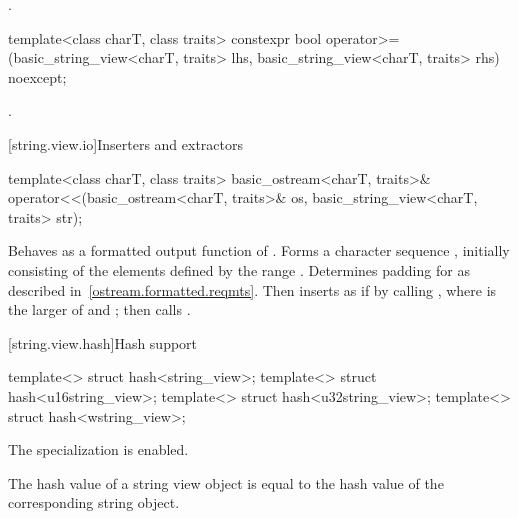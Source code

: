 \begin{itemdescr}
\pnum
\returns
{}.
\end{itemdescr}

%
\begin{itemdecl}
template<class charT, class traits>
  constexpr bool operator>=(basic_string_view<charT, traits> lhs,
                            basic_string_view<charT, traits> rhs) noexcept;
\end{itemdecl}

\begin{itemdescr}
\pnum
\returns
{}.
\end{itemdescr}

[string.view.io]{Inserters and extractors}

%
\begin{itemdecl}
template<class charT, class traits>
  basic_ostream<charT, traits>&
    operator<<(basic_ostream<charT, traits>& os, basic_string_view<charT, traits> str);
\end{itemdecl}

\begin{itemdescr}
\pnum
\effects
Behaves as a formatted output
function of . Forms a character sequence
, initially consisting of the elements defined by the range
. Determines padding for 
as described in~\ref{ostream.formatted.reqmts}.
Then inserts  as if by calling
, where  is the larger
of  and ;
then calls .

\pnum
\returns
{}
\end{itemdescr}

[string.view.hash]{Hash support}

%
%
%
%
\begin{itemdecl}
template<> struct hash<string_view>;
template<> struct hash<u16string_view>;
template<> struct hash<u32string_view>;
template<> struct hash<wstring_view>;
\end{itemdecl}

\begin{itemdescr}
\pnum
The specialization is enabled.
\begin{note}
The hash value of a string view object is equal to the hash value of
the corresponding string object.
\end{note}
\end{itemdescr}

